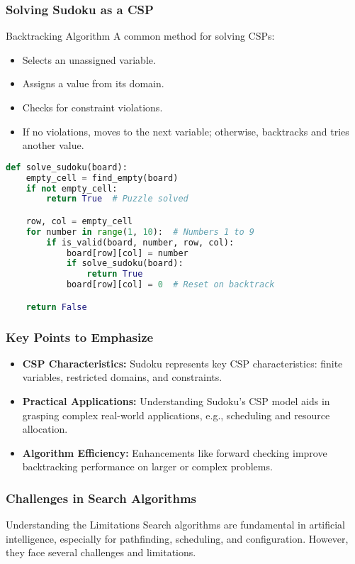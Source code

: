 \documentclass[aspectratio=169]{beamer}
\begin{document}
\begin{frame}[fragile]
    \frametitle{Solving Sudoku as a CSP}
    \begin{block}{Backtracking Algorithm}
        A common method for solving CSPs:
        \begin{itemize}
            \item Selects an unassigned variable.
            \item Assigns a value from its domain.
            \item Checks for constraint violations.
            \item If no violations, moves to the next variable; otherwise, backtracks and tries another value.
        \end{itemize}
    \end{block}
    
    \begin{lstlisting}[language=Python]
def solve_sudoku(board):
    empty_cell = find_empty(board)
    if not empty_cell:
        return True  # Puzzle solved

    row, col = empty_cell
    for number in range(1, 10):  # Numbers 1 to 9
        if is_valid(board, number, row, col):
            board[row][col] = number
            if solve_sudoku(board):
                return True
            board[row][col] = 0  # Reset on backtrack

    return False
    \end{lstlisting}
\end{frame}

\begin{frame}
    \frametitle{Key Points to Emphasize}
    \begin{itemize}
        \item \textbf{CSP Characteristics:} Sudoku represents key CSP characteristics: finite variables, restricted domains, and constraints.
        \item \textbf{Practical Applications:} Understanding Sudoku’s CSP model aids in grasping complex real-world applications, e.g., scheduling and resource allocation.
        \item \textbf{Algorithm Efficiency:} Enhancements like forward checking improve backtracking performance on larger or complex problems.
    \end{itemize}
\end{frame}

\begin{frame}[fragile]
    \frametitle{Challenges in Search Algorithms}
    \begin{block}{Understanding the Limitations}
        Search algorithms are fundamental in artificial intelligence, especially for pathfinding, scheduling, and configuration. However, they face several challenges and limitations.
    \end{block}
\end{frame}
\end{document}
